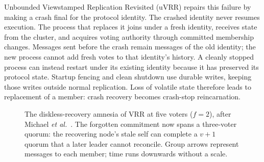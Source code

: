 \documentclass[10pt,journal,letterpaper]{IEEEtran}
\begin{document}
Unbounded Viewstamped Replication Revisited (uVRR) repairs this failure by
making a crash final for the protocol identity.
The crashed identity never resumes execution.
The process that replaces it joins under a fresh identity, receives state from
the cluster, and acquires voting authority through committed membership changes.
Messages sent before the crash remain messages of the old identity; the new
process cannot add fresh votes to that identity's history.
A cleanly stopped process can instead restart under its existing identity because
it has preserved its protocol state.
Startup fencing and clean shutdown use durable writes, keeping those writes
outside normal replication. Loss of volatile state therefore leads to replacement
of a member: crash recovery becomes crash-stop reincarnation.

\begin{figure}[t]
\centering
{}
\caption{The diskless-recovery amnesia of VRR at five voters ($f{=}2$), after Michael \emph{et al.}~\cite[Sec.~4.2 and Appendix~A.1]{diskless}. The forgotten commitment now spans a three-voter quorum: the recovering node's stale self can complete a $v{+}1$ quorum that a later leader cannot reconcile. Group arrows represent messages to each member; time runs downwards without a scale.}
\label{fig:amnesia5}
\end{figure}
\end{document}

